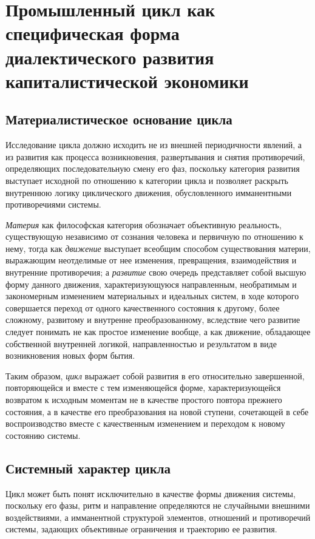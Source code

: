 \section{Промышленный цикл как специфическая форма диалектического развития капиталистической экономики}

\subsection{Материалистическое основание цикла}
Исследование цикла должно исходить не из внешней периодичности явлений, а из развития как процесса возникновения, развертывания и снятия противоречий, определяющих последовательную смену его фаз, поскольку категория развития выступает исходной по отношению к категории цикла и позволяет раскрыть внутреннюю логику циклического движения, обусловленного имманентными противоречиями системы.

\textit{Материя} как философская категория обозначает объективную реальность, существующую независимо от сознания человека и первичную по отношению к нему, тогда как \textit{движение} выступает всеобщим способом существования материи, выражающим неотделимые от нее изменения, превращения, взаимодействия и внутренние противоречия; а \textit{развитие} свою очередь представляет собой высшую форму данного движения, характеризующуюся направленным, необратимым и закономерным изменением материальных и идеальных систем, в ходе которого совершается переход от одного качественного состояния к другому, более сложному, развитому и внутренне преобразованному, вследствие чего развитие следует понимать не как простое изменение вообще, а как движение, обладающее собственной внутренней логикой, направленностью и результатом в виде возникновения новых форм бытия.

Таким образом, \textit{цикл} выражает собой развития в его относительно завершенной, повторяющейся и вместе с тем изменяющейся форме, характеризующейся возвратом к исходным моментам не в качестве простого повтора прежнего состояния, а в качестве его преобразования на новой ступени, сочетающей в себе воспроизводство вместе с качественным изменением и переходом к новому состоянию системы.

\subsection{Системный характер цикла}
Цикл может быть понят исключительно в качестве формы движения системы, поскольку его фазы, ритм и направление определяются не случайными внешними воздействиями, а имманентной структурой элементов, отношений и противоречий системы, задающих объективные ограничения и траекторию ее развития.

